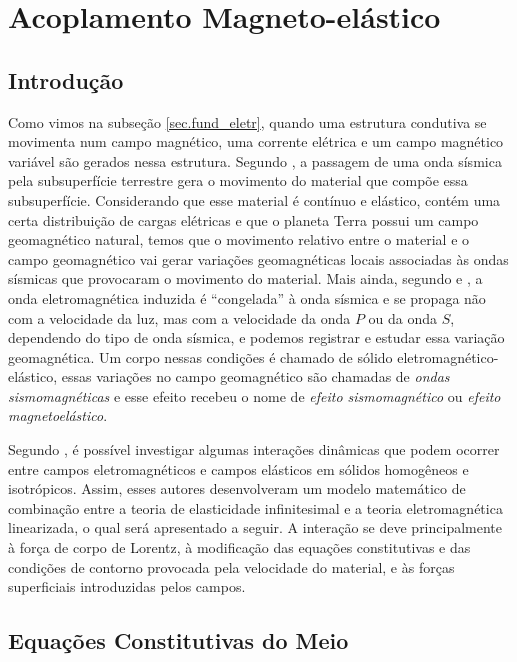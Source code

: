 \chapter{Acoplamento Magneto-el\'astico}

\section{Introdu\c{c}\~ao}

Como vimos na subse\c{c}\~ao \ref{sec.fund_eletr}, quando uma estrutura condutiva se movimenta num campo magn\'etico, uma corrente el\'etrica e um campo magn\'etico vari\'avel s\~ao gerados nessa estrutura. Segundo \cite{Mikhailenko_1997}, a passagem de uma onda s\'ismica pela subsuperf\'icie terrestre gera o movimento do material que comp\~oe essa subsuperf\'icie. Considerando que esse material \'e cont\'inuo e el\'astico, cont\'em uma certa distribui\c{c}\~ao de cargas el\'etricas e que o planeta Terra possui um campo geomagn\'etico natural, temos que o movimento relativo entre o material e o campo geomagn\'etico vai gerar varia\c{c}\~oes geomagn\'eticas locais associadas \`as ondas s\'ismicas que provocaram o movimento do material. Mais ainda, segundo \cite{Anisimov_1985} e \cite{Sadovsky_1980}, a onda eletromagn\'etica induzida \'e ``congelada'' \`a onda s\'ismica e se propaga n\~ao com a velocidade da luz, mas com a velocidade da onda $P$ ou da onda $S$, dependendo do tipo de onda s\'ismica, e podemos registrar e estudar essa varia\c{c}\~ao geomagn\'etica.
Um corpo nessas condi\c{c}\~oes \'e chamado de s\'olido eletromagn\'etico-el\'astico, essas varia\c{c}\~oes no campo geomagn\'etico s\~ao chamadas de \textit{ondas sismomagn\'eticas} e esse efeito recebeu o nome de \textit{efeito sismomagn\'etico} ou \textit{efeito magnetoel\'astico}.

Segundo \cite{eringen_1963}, \'e poss\'ivel investigar algumas intera\c{c}\~oes din\^amicas que podem ocorrer entre campos eletromagn\'eticos e campos el\'asticos em s\'olidos homog\^eneos e isotr\'opicos. Assim, esses autores desenvolveram um modelo matem\'atico de combina\c{c}\~ao entre a teoria de elasticidade infinitesimal e a teoria eletromagn\'etica linearizada, o qual ser\'a apresentado a seguir. A intera\c{c}\~ao se deve principalmente \`a for\c{c}a de corpo de Lorentz, \`a modifica\c{c}\~ao das equa\c{c}\~oes constitutivas e das condi\c{c}\~oes de contorno provocada pela velocidade do material, e \`as for\c{c}as superficiais introduzidas pelos campos.


\section{Equa\c{c}\~oes Constitutivas do Meio}

